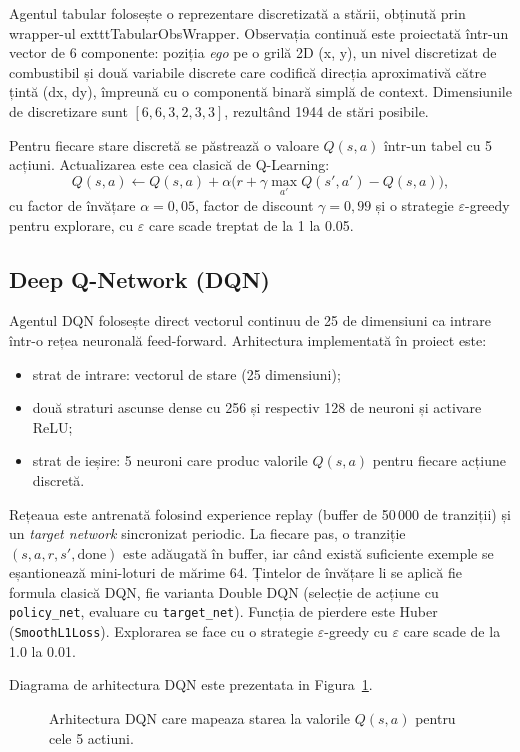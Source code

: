 \documentclass[11pt,a4paper]{article}
\begin{document}
Agentul tabular folosește o reprezentare discretizată a stării, obținută prin wrapper-ul
  exttt{TabularObsWrapper}. Observația continuă este proiectată într-un vector de 6 componente:
poziția \emph{ego} pe o grilă 2D (x, y), un nivel discretizat de combustibil și două variabile
discrete care codifică direcția aproximativă către țintă (dx, dy), împreună cu o componentă binară
simplă de context. Dimensiunile de discretizare sunt $[6, 6, 3, 2, 3, 3]$, rezultând 1944 de stări
posibile.

Pentru fiecare stare discretă se păstrează o valoare $Q(s,a)$ într-un tabel cu 5 acțiuni. Actualizarea
este cea clasică de Q-Learning:
\[
Q(s,a) \leftarrow Q(s,a) + \alpha \bigl(r + \gamma \max\limits_{a'} Q(s', a') - Q(s,a)\bigr),
\]
cu factor de învățare $\alpha = 0{,}05$, factor de discount $\gamma = 0{,}99$ și o strategie
$\varepsilon$-greedy pentru explorare, cu $\varepsilon$ care scade treptat de la 1 la 0.05.

\subsection{Deep Q-Network (DQN)}

Agentul DQN folosește direct vectorul continuu de 25 de dimensiuni ca intrare într-o rețea neuronală
feed-forward. Arhitectura implementată în proiect este:
\begin{itemize}
  \item strat de intrare: vectorul de stare (25 dimensiuni);
  \item două straturi ascunse dense cu 256 și respectiv 128 de neuroni și activare ReLU;
  \item strat de ieșire: 5 neuroni care produc valorile $Q(s,a)$ pentru fiecare acțiune discretă.
\end{itemize}

Rețeaua este antrenată folosind experience replay (buffer de 50\,000 de tranziții) și un
\emph{target network} sincronizat periodic. La fiecare pas, o tranziție $(s,a,r,s',\text{done})$
este adăugată în buffer, iar când există suficiente exemple se eșantionează mini-loturi de mărime 64.
Țintelor de învățare li se aplică fie formula clasică DQN, fie varianta Double DQN (selecție
de acțiune cu \texttt{policy\_net}, evaluare cu \texttt{target\_net}). Funcția de pierdere este
Huber (\texttt{SmoothL1Loss}). Explorarea se face cu o strategie $\varepsilon$-greedy cu
$\varepsilon$ care scade de la 1.0 la 0.01.

Diagrama de arhitectura DQN este prezentata in Figura~\ref{fig:dqn-arch}.
\begin{figure}[h]
  \centering
  \DQNArchitectureDiagram
  \caption{Arhitectura DQN care mapeaza starea la valorile $Q(s,a)$ pentru cele 5 actiuni.}
  \label{fig:dqn-arch}
\end{figure}
\end{document}
